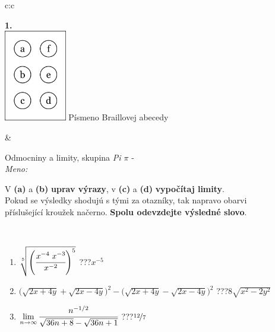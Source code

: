\documentclass[10pt]{report}
\begin{document}
\begin{tabular}{c:c}
\begin{minipage}[c][104.5mm][t]{0.5\linewidth}
\begin{center}
\begin{minipage}{0.20\linewidth}
\begin{center}
{\Huge\bfseries 1.} \\[2mm]
\includegraphics[height=40mm]{../images/braille.png}
{\small Písmeno Braillovej abecedy}
\end{center}
\end{minipage}
\end{center}
\end{minipage}
&
\begin{minipage}[c][104.5mm][t]{0.5\linewidth}
\begin{center}
\vspace{7mm}
{\huge Odmocniny a limity, skupina \textit{Pi $\pi$} -}\\[5mm]
\textit{Meno:}\phantom{xxxxxxxxxxxxxxxxxxxxxxxxxxxxxxxxxxxxxxxxxxxxxxxxxxxxxxxxxxxxxxxxx}\\[5mm]
\begin{minipage}{0.95\linewidth}
\begin{center}
V \textbf{(a)} a \textbf{(b)} \textbf{uprav výrazy}, v \textbf{(c)} a \textbf{(d)} \textbf{vypočítaj limity}.\\Pokud se výsledky shodujú s tými za otazníky, tak napravo obarvi\\příslušející kroužek načerno. \textbf{Spolu odevzdejte výsledné slovo}.
\end{center}
\end{minipage}
\\[1mm]
\begin{minipage}{0.79\linewidth}
\begin{center}
\begin{varwidth}{\linewidth}
\begin{enumerate}
\small
\item $\sqrt[5]{\left(\cfrac{x^{-4}\;x^{-3}}{x^{-2}}\right)^{5}}$\quad \dotfill\; ???\;\dotfill \quad $x^{-5}$
\item {\footnotesize{\scriptsize$\big(\sqrt{2x+4y}+\sqrt{2x-4y}\big)^2-\big(\sqrt{2x+4y}-\sqrt{2x-4y}\big)^2$}\quad \dotfill\; ???\;\dotfill \quad $8\sqrt{x^2-2y^2}$}
\item $\lim\limits_{n\to\infty}\cfrac{n^{-1/2}}{\sqrt{36n+8}-\sqrt{36n+1}}$\quad \dotfill\; ???\;\dotfill \quad $\nicefrac{12}{7}$

\end{enumerate}
\end{varwidth}
\end{center}
\end{minipage}
\end{center}
\end{minipage}
\end{tabular}
\end{document}
